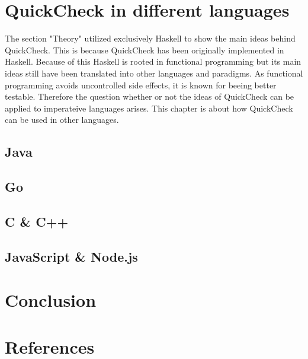 \documentclass[a4paper, 12pt]{article} %
\begin{document}

\section{QuickCheck in different languages}

The section "Theory" utilized exclusively Haskell to show the main ideas behind QuickCheck. This is because QuickCheck has been originally implemented in Haskell. Because of this Haskell is rooted in functional programming but its main ideas still have been translated into other languages and paradigms. As functional programming avoids uncontrolled side effects, it is known for beeing better testable. Therefore the question whether or not the ideas of QuickCheck can be applied to imperateive languages arises. This chapter is about how QuickCheck can be used in other languages.

\subsection{Java}
\subsection{Go}
\subsection{C \& C++}
\subsection{JavaScript \& Node.js}

\section{Conclusion}


\newpage
\section{References}
\printbibliography[heading=none]
\end{document}
